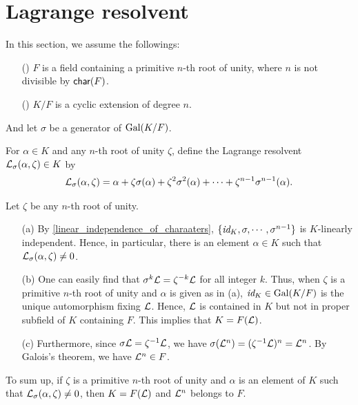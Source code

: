 \section{Lagrange resolvent}\label{Lagrange_resolvent}

In this section, we assume the followings:
\begin{enumerate}
    \item[(\romannumeral 1)]
    {
        $F$ is a field containing a primitive $n$-th root of unity, where $n$ is not divisible by ${\textsf{char}({F})}$.
    }
    \item[(\romannumeral 2)]
    {
        $K/F$ is a cyclic extension of degree $n$.
    }
\end{enumerate}
And let $\sigma$ be a generator of ${\textrm{Gal}({K/F})}$.

\begin{defi}
    For $\alpha\in K$ and any $n$-th root of unity $\zeta$, define the Lagrange resolvent ${\mathcal{L}}_\sigma(\alpha, \zeta)\in K$ by
    \begin{align*}
        {\mathcal{L}}_\sigma(\alpha, \zeta)=\alpha+\zeta\sigma(\alpha)+\zeta^2\sigma^2(\alpha)+\cdots+\zeta^{n-1}\sigma^{n-1}(\alpha).
    \end{align*}
\end{defi}
\begin{obs}\label{the proof of cyclic->radical}
    Let $\zeta$ be any $n$-th root of unity.
    \begin{enumerate}
        \item[(a)]
        {
            By \cref{linear_independence_of_charaaters}, $\{\textit{id}_{K}, \sigma, \cdots, \sigma^{n-1}\}$ is $K$-linearly independent.
            Hence, in particular, there is an element $\alpha\in K$ such that ${\mathcal{L}}_\sigma(\alpha, \zeta)\neq 0$.
        }
        \item[(b)]
        {
            One can easily find that $\sigma^k{\mathcal{L}}=\zeta^{-k}{\mathcal{L}}$ for all integer $k$.
            Thus, when $\zeta$ is a primitive $n$-th root of unity and $\alpha$ is given as in (a), $\textit{id}_{K}\in{\textrm{Gal}({K/F})}$ is the unique automorphism fixing ${\mathcal{L}}$.
            Hence, ${\mathcal{L}}$ is contained in $K$ but not in proper subfield of $K$ containing $F$.
            This implies that $K=F({\mathcal{L}})$.
        }
        \item[(c)]
        {
            Furthermore, since $\sigma{\mathcal{L}}=\zeta^{-1}{\mathcal{L}}$, we have $\sigma({\mathcal{L}}^n)=(\zeta^{-1}{\mathcal{L}})^n={\mathcal{L}}^n$.
            By Galois's theorem, we have ${\mathcal{L}}^n\in F$.
        }
    \end{enumerate}
    To sum up, if $\zeta$ is a primitive $n$-th root of unity and $\alpha$ is an element of $K$ such that ${\mathcal{L}}_\sigma(\alpha, \zeta)\neq 0$, then $K=F({\mathcal{L}})$ and ${\mathcal{L}}^n$ belongs to $F$.
\end{obs}